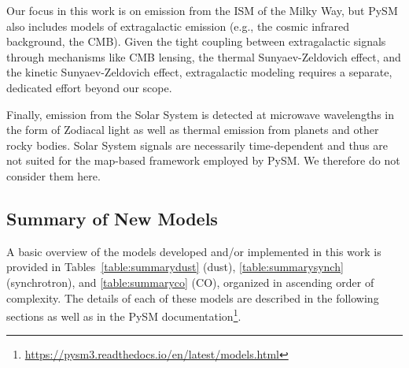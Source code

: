 \documentclass[twocolumn]{aastex631}
\begin{document}
Our focus in this work is on emission from the ISM of the Milky Way, but PySM also includes models of extragalactic emission (e.g., the cosmic infrared background, the CMB). Given the tight coupling between extragalactic signals through mechanisms like CMB lensing, the thermal Sunyaev-Zeldovich effect, and the kinetic Sunyaev-Zeldovich effect, extragalactic modeling requires a separate, dedicated effort beyond our scope.

Finally, emission from the Solar System is detected at microwave wavelengths in the form of Zodiacal light as well as thermal emission from planets and other rocky bodies. Solar System signals are necessarily time-dependent and thus are not suited for the map-based framework employed by PySM. We therefore do not consider them here.

\subsection{Summary of New Models}
A basic overview of the models developed and/or implemented in this work is provided in Tables~\ref{table:summarydust} (dust), \ref{table:summarysynch} (synchrotron), and \ref{table:summaryco} (CO), organized in ascending order of complexity. The details of each of these models are described in the following sections as well as in the PySM documentation\footnote{\url{https://pysm3.readthedocs.io/en/latest/models.html}}.
\end{document}
